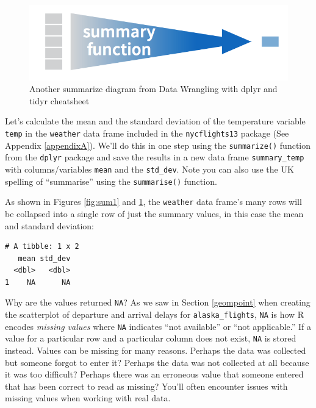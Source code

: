 \documentclass[12pt, krantz2,]{krantz}
\makeatletter
\newenvironment{Shaded}{\begin{snugshade}}{\end{snugshade}}
\newcommand{\DataTypeTok}[1]{\textcolor[rgb]{0.27,0.27,0.27}{#1}}
\newcommand{\KeywordTok}[1]{\textcolor[rgb]{0.27,0.27,0.27}{\textbf{#1}}}
\newcommand{\NormalTok}[1]{#1}
\newcommand{\OperatorTok}[1]{\textcolor[rgb]{0.43,0.43,0.43}{\textbf{#1}}}
\newcommand{\StringTok}[1]{\textcolor[rgb]{0.5,0.5,0.5}{#1}}
\newenvironment{kframe}{%
\medskip{}
\setlength{\fboxsep}{.8em}
 \def\at@end@of@kframe{}%
 \ifinner\ifhmode%
  \def\at@end@of@kframe{\end{minipage}}%
  \begin{minipage}{\columnwidth}%
 \fi\fi%
 \def\FrameCommand##1{\hskip\@totalleftmargin \hskip-\fboxsep
 \colorbox{shadecolor}{##1}\hskip-\fboxsep
     \hskip-\linewidth \hskip-\@totalleftmargin \hskip\columnwidth}%
 \MakeFramed {\advance\hsize-\width
   \@totalleftmargin\z@ \linewidth\hsize
   \@setminipage}}%
 {\par\unskip\endMakeFramed%
 \at@end@of@kframe}
\renewenvironment{Shaded}{\begin{kframe}}{\end{kframe}}
\makeatother
\begin{document}
\begin{figure}

{\centering \includegraphics[width=\textwidth]{images/summary} 

}

\caption{Another summarize diagram from Data Wrangling with dplyr and tidyr cheatsheet}\label{fig:sum2}
\end{figure}

Let's calculate the mean and the standard deviation of the temperature variable \texttt{temp} in the \texttt{weather} data frame included in the \texttt{nycflights13} package (See Appendix \ref{appendixA}). We'll do this in one step using the \texttt{summarize()} function from the \texttt{dplyr} package and save the results in a new data frame \texttt{summary\_temp} with columns/variables \texttt{mean} and the \texttt{std\_dev}. Note you can also use the UK spelling of ``summarise'' using the \texttt{summarise()} function.

As shown in Figures \ref{fig:sum1} and \ref{fig:sum2}, the \texttt{weather} data frame's many rows will be collapsed into a single row of just the summary values, in this case the mean and standard deviation:

\begin{Shaded}
\end{Shaded}

\begin{verbatim}
# A tibble: 1 x 2
   mean std_dev
  <dbl>   <dbl>
1    NA      NA
\end{verbatim}

Why are the values returned \texttt{NA}? As we saw in Section \ref{geompoint} when creating the scatterplot of departure and arrival delays for \texttt{alaska\_flights}, \texttt{NA} is how R encodes \emph{missing values} where \texttt{NA} indicates ``not available'' or ``not applicable.'' If a value for a particular row and a particular column does not exist, \texttt{NA} is stored instead. Values can be missing for many reasons. Perhaps the data was collected but someone forgot to enter it? Perhaps the data was not collected at all because it was too difficult? Perhaps there was an erroneous value that someone entered that has been correct to read as missing? You'll often encounter issues with missing values when working with real data.
\end{document}
